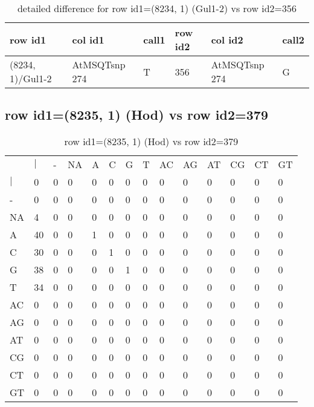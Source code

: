 \begin{center}
\begin{longtable}{|l|l|l|l|l|l|}
\caption{detailed difference for row id1=(8234, 1) (Gul1-2) vs row id2=356} \label{table_dm355}\\
\hline
row id1&col id1&call1&row id2&col id2&call2\\
\hline
(8234, 1)/Gul1-2&AtMSQTsnp 274&T&356&AtMSQTsnp 274&G\\
\hline
\end{longtable}
\end{center}

\subsection{row id1=(8235, 1) (Hod) vs row id2=379}
\begin{center}
\begin{longtable}{|l|l|l|l|l|l|l|l|l|l|l|l|l|l|}
\caption{row id1=(8235, 1) (Hod) vs row id2=379} \label{table_dm356}\\
\hline
\\
\hline
&$|$&-&NA&A&C&G&T&AC&AG&AT&CG&CT&GT\\
$|$&0&0&0&0&0&0&0&0&0&0&0&0&0\\
-&0&0&0&0&0&0&0&0&0&0&0&0&0\\
NA&4&0&0&0&0&0&0&0&0&0&0&0&0\\
A&40&0&0&1&0&0&0&0&0&0&0&0&0\\
C&30&0&0&0&1&0&0&0&0&0&0&0&0\\
G&38&0&0&0&0&1&0&0&0&0&0&0&0\\
T&34&0&0&0&0&0&0&0&0&0&0&0&0\\
AC&0&0&0&0&0&0&0&0&0&0&0&0&0\\
AG&0&0&0&0&0&0&0&0&0&0&0&0&0\\
AT&0&0&0&0&0&0&0&0&0&0&0&0&0\\
CG&0&0&0&0&0&0&0&0&0&0&0&0&0\\
CT&0&0&0&0&0&0&0&0&0&0&0&0&0\\
GT&0&0&0&0&0&0&0&0&0&0&0&0&0\\
\hline
\end{longtable}
\end{center}

